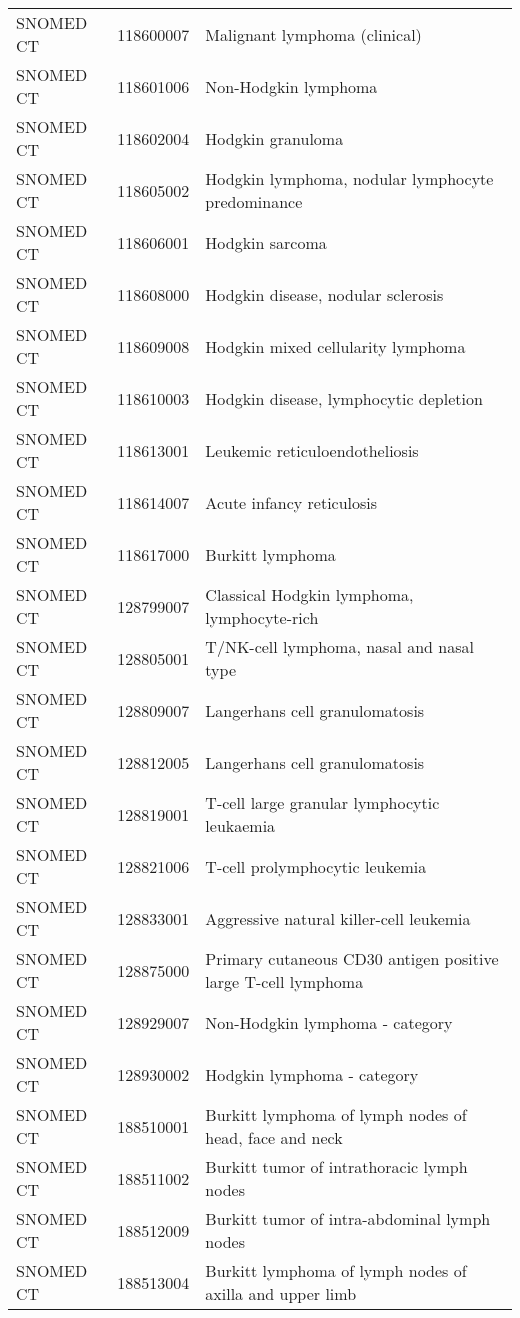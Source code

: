 \begin{longtable}{p{}p{}p{}}
  SNOMED CT & 118600007 & Malignant lymphoma (clinical) \\ 
  SNOMED CT & 118601006 & Non-Hodgkin lymphoma \\ 
  SNOMED CT & 118602004 & Hodgkin granuloma \\ 
  SNOMED CT & 118605002 & Hodgkin lymphoma, nodular lymphocyte predominance \\ 
  SNOMED CT & 118606001 & Hodgkin sarcoma \\ 
  SNOMED CT & 118608000 & Hodgkin disease, nodular sclerosis \\ 
  SNOMED CT & 118609008 & Hodgkin mixed cellularity lymphoma \\ 
  SNOMED CT & 118610003 & Hodgkin disease, lymphocytic depletion \\ 
  SNOMED CT & 118613001 & Leukemic reticuloendotheliosis \\ 
  SNOMED CT & 118614007 & Acute infancy reticulosis \\ 
  SNOMED CT & 118617000 & Burkitt lymphoma \\ 
  SNOMED CT & 128799007 & Classical Hodgkin lymphoma, lymphocyte-rich \\ 
  SNOMED CT & 128805001 & T/NK-cell lymphoma, nasal and nasal type \\ 
  SNOMED CT & 128809007 & Langerhans cell granulomatosis \\ 
  SNOMED CT & 128812005 & Langerhans cell granulomatosis \\ 
  SNOMED CT & 128819001 & T-cell large granular lymphocytic leukaemia \\ 
  SNOMED CT & 128821006 & T-cell prolymphocytic leukemia \\ 
  SNOMED CT & 128833001 & Aggressive natural killer-cell leukemia \\ 
  SNOMED CT & 128875000 & Primary cutaneous CD30 antigen positive large T-cell lymphoma \\ 
  SNOMED CT & 128929007 & Non-Hodgkin lymphoma - category \\ 
  SNOMED CT & 128930002 & Hodgkin lymphoma - category \\ 
  SNOMED CT & 188510001 & Burkitt lymphoma of lymph nodes of head, face and neck \\ 
  SNOMED CT & 188511002 & Burkitt tumor of intrathoracic lymph nodes \\ 
  SNOMED CT & 188512009 & Burkitt tumor of intra-abdominal lymph nodes \\ 
  SNOMED CT & 188513004 & Burkitt lymphoma of lymph nodes of axilla and upper limb \\ 

\end{longtable}

